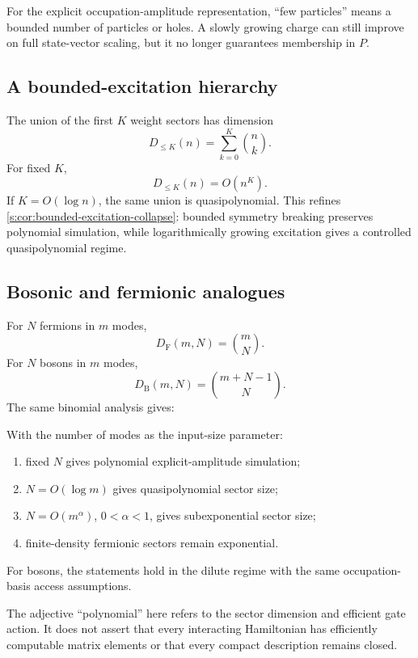 \begin{derivedbox}
For the explicit occupation-amplitude representation, ``few particles'' means a bounded number of particles or holes. A slowly growing charge can still improve on full state-vector scaling, but it no longer guarantees membership in $P$.
\end{derivedbox}

\subsection{A bounded-excitation hierarchy}
The union of the first $K$ weight sectors has dimension
\[
D_{\le K}(n)
=
\sum_{k=0}^{K}\binom nk.
\]
For fixed $K$,
\[
D_{\le K}(n)=O(n^K).
\]
If $K=O(\log n)$, the same union is quasipolynomial. This refines \cref{s:cor:bounded-excitation-collapse}: bounded symmetry breaking preserves polynomial simulation, while logarithmically growing excitation gives a controlled quasipolynomial regime.

\subsection{Bosonic and fermionic analogues}
For $N$ fermions in $m$ modes,
\[
D_{\mathrm F}(m,N)=\binom mN.
\]
For $N$ bosons in $m$ modes,
\[
D_{\mathrm B}(m,N)=\binom{m+N-1}{N}.
\]
The same binomial analysis gives:

\begin{corollary}
\label{s:cor:few-particle-scaling}
With the number of modes as the input-size parameter:
\begin{enumerate}
\item fixed $N$ gives polynomial explicit-amplitude simulation;
\item $N=O(\log m)$ gives quasipolynomial sector size;
\item $N=O(m^\alpha)$, $0<\alpha<1$, gives subexponential sector size;
\item finite-density fermionic sectors remain exponential.
\end{enumerate}
For bosons, the statements hold in the dilute regime with the same occupation-basis access assumptions.
\end{corollary}

The adjective ``polynomial'' here refers to the sector dimension and efficient gate action. It does not assert that every interacting Hamiltonian has efficiently computable matrix elements or that every compact description remains closed.


